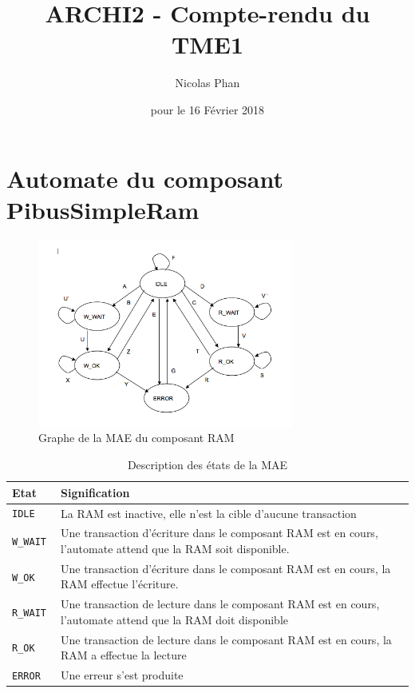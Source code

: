 \documentclass{article}
\title{ARCHI2 - Compte-rendu du TME1}
\author{Nicolas Phan}
\date{pour le 16 Février 2018}
\begin{document}
\pagestyle{headings}
\maketitle
\tableofcontents
\newpage



\section{Automate du composant PibusSimpleRam}

\begin{figure}[H]
\includegraphics[width=0.75\textwidth]{pics/mae_ram.png}
\centering
\caption{Graphe de la MAE du composant RAM}
\label{mae_ram}
\end{figure}

\begin{table}[H]
\centering
\begingroup
\setlength{\tabcolsep}{5pt}
\renewcommand{\arraystretch}{1.1}
\begin{tabular}{| l | p{15cm} |}
\hline
Etat    & Signification \\
\hline
\tt{IDLE}    & La RAM est inactive, elle n'est la cible d'aucune transaction \\
\hline
\tt{W\_WAIT}   & Une transaction d'écriture dans le composant RAM est en cours,
        l'automate attend que la RAM soit disponible. \\
\hline
\tt{W\_OK}     & Une transaction d'écriture dans le composant RAM est en cours,
        la RAM effectue l'écriture. \\
\hline
\tt{R\_WAIT}   & Une transaction de lecture dans le composant RAM est en cours,
        l'automate attend que la RAM doit disponible \\
\hline
\tt{R\_OK}     & Une transaction de lecture dans le composant RAM est en cours,
        la RAM a effectue la lecture \\
\hline
\tt{ERROR}   & Une erreur s'est produite \\
\hline
\end{tabular}
\caption{Description des états de la MAE}
\endgroup
\end{table}
\end{document}
